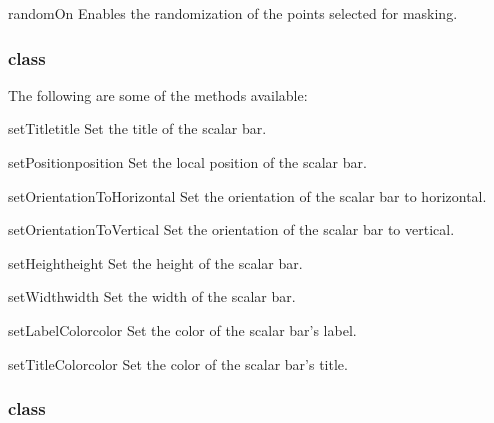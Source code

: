 \begin{methoddesc}[MaskPoints]{randomOn}{}
Enables the randomization of the points selected for masking.
\end{methoddesc}


\subsubsection{\ScalarBar class}

The following are some of the methods available:

\begin{methoddesc}[ScalarBar]{setTitle}{title}
Set the title of the scalar bar.
\end{methoddesc}

\begin{methoddesc}[ScalarBar]{setPosition}{position}
Set the local position of the scalar bar.
\end{methoddesc}

\begin{methoddesc}[ScalarBar]{setOrientationToHorizontal}{}
Set the orientation of the scalar bar to horizontal.
\end{methoddesc}

\begin{methoddesc}[ScalarBar]{setOrientationToVertical}{}
Set the orientation of the scalar bar to vertical.
\end{methoddesc}

\begin{methoddesc}[ScalarBar]{setHeight}{height}
Set the height of the scalar bar.
\end{methoddesc}

\begin{methoddesc}[ScalarBar]{setWidth}{width}
Set the width of the scalar bar.
\end{methoddesc}

\begin{methoddesc}[ScalarBar]{setLabelColor}{color}
Set the color of the scalar bar's label.
\end{methoddesc}

\begin{methoddesc}[ScalarBar]{setTitleColor}{color}
Set the color of the scalar bar's title.
\end{methoddesc}

\subsubsection{\ImageReslice class}

